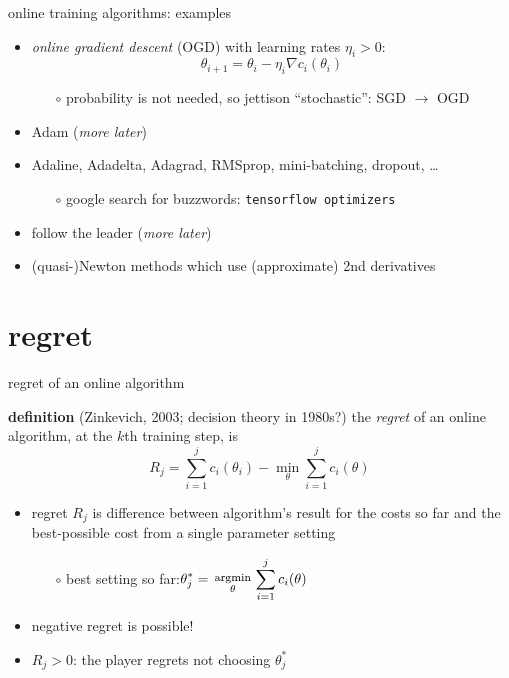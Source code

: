 \documentclass[svgnames,
               hyperref={colorlinks,citecolor=DeepPink4,linkcolor=FireBrick,urlcolor=Maroon},
               usepdftitle=false]  %
               {beamer}
\newcommand{\grad}{\nabla}
\newcommand{\ds}{\displaystyle}
\begin{document}
\begin{frame}{online training algorithms: examples}

\begin{itemize}
\item \emph{online gradient descent} (OGD) with learning rates $\eta_i>0$:
   $$\theta_{i+1} = \theta_i - \eta_i \grad c_i(\theta_i)$$

    \begin{itemize}
    \item[$\circ$] probability is not needed, so jettison ``stochastic'': SGD $\to$ OGD
    \end{itemize}
\item Adam (\emph{more later})
\item Adaline, Adadelta, Adagrad, RMSprop, mini-batching, dropout, \dots
    \begin{itemize}
    \item[$\circ$] google search for buzzwords: \quad \texttt{tensorflow optimizers}
    \end{itemize}
\item follow the leader (\emph{more later})
\item (quasi-)Newton methods which use (approximate) 2nd derivatives
\end{itemize}
\end{frame}


\section{regret}

\begin{frame}{regret of an online algorithm}

\begin{block}{\textbf{definition} (Zinkevich, 2003; decision theory in 1980s?)}
the \emph{regret} of an online algorithm, at the $k$th training step, is
    $$R_j = \sum_{i=1}^j c_i(\theta_i) - \min_\theta \sum_{i=1}^j c_i(\theta)$$
\end{block}

\begin{itemize}
\item regret $R_j$ is difference between algorithm's result for the costs so far and the best-possible cost from a single parameter setting
    \begin{itemize}
    \item[$\circ$] best setting so far:\quad  $\ds \theta_j^* = \begin{smallmatrix} \phantom{x} \\ \text{\footnotesize argmin} \\ \theta \end{smallmatrix} \sum_{i=1}^j c_i(\theta)$
    \end{itemize}

\smallskip
\item negative regret is possible!
\item $R_j>0$: the player regrets not choosing $\theta_j^*$
\end{itemize}
\end{frame}
\end{document}

